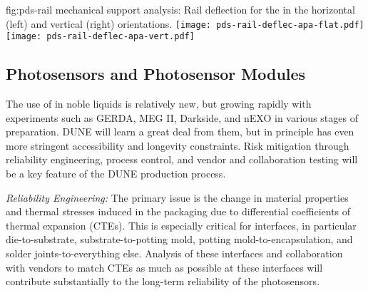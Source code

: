 
\begin{dunefigure}{fig:pds-rail}
{ mechanical support analysis: Rail deflection for the  in the horizontal (left) and vertical (right) orientations.}
	\texttt{[image: pds-rail-deflec-apa-flat.pdf]} 
	\texttt{[image: pds-rail-deflec-apa-vert.pdf]}\\
\end{dunefigure}


\subsection{Photosensors and Photosensor Modules}
\label{sec:fdsp-pd-assy-psm}


The use of  in noble liquids is relatively new, but growing rapidly with experiments such as GERDA, MEG II, Darkside, and nEXO in various stages of preparation.
DUNE will learn a great deal from them, but in principle has even more stringent accessibility and longevity constraints. Risk mitigation through reliability engineering, process control, and vendor and collaboration testing will be a key feature of the DUNE  production process.

{\textit{Reliability Engineering:}} The primary issue is the change in material properties and thermal stresses induced in the packaging due to differential coefficients of thermal expansion (CTEs). This is especially critical for interfaces, in particular
die-to-substrate, substrate-to-potting mold, potting mold-to-encapsulation, and solder joints-to-everything else. Analysis of these interfaces and collaboration with vendors to match CTEs as much as possible at these interfaces will contribute substantially to the long-term reliability of the photosensors.

